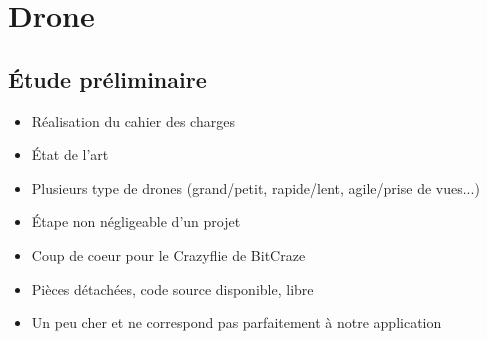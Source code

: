 \documentclass{beamer}
\begin{document}
  {
    \section{Drone}
    
      \begin{frame}
	\tableofcontents[hideothersubsections]
      \end{frame}
    
      \subsection{Étude préliminaire}
	\begin{frame}
	  \begin{itemize}
	    \item Réalisation du cahier des charges
	    \item État de l'art
	    \item Plusieurs type de drones (grand/petit, rapide/lent, agile/prise de vues...)
	    \item Étape non négligeable d'un projet
	  \end{itemize}
	\end{frame}
	
	\begin{frame}
	  \begin{itemize}
	    \item Coup de coeur pour le Crazyflie de BitCraze
	    \item Pièces détachées, code source disponible, libre
	    \item Un peu cher et ne correspond pas parfaitement à notre application
	  \end{itemize}
	\end{frame}
	
}
\end{document}
